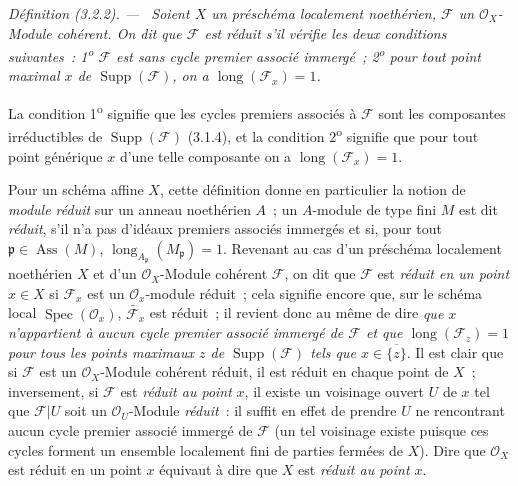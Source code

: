 \documentclass[10pt,oneside]{book}
\newcommand{\oldpage}[2][]{%
  \setcounter{footnote}{0}%
  \marginpar{\scriptsize\textbf{#1}~|~#2}\ignorespaces}
\newenvironment{definition}[1][]{%
  \par\medskip\noindent\itshape Définition (#1). ---\ }{\par}
\begin{document}
\begin{definition}[3.2.2]
\label{IV.2.3.2.2-fr}
Soient $X$ un préschéma localement noethérien, $\mathcal F$ un
$\mathcal O_X$-Module cohérent. On dit que $\mathcal F$ est \emph{réduit}
s'il vérifie les deux conditions suivantes~: 1\textsuperscript{o}
$\mathcal F$ est sans cycle premier associé immergé~; 2\textsuperscript{o}
pour tout point maximal $x$ de $\operatorname{Supp}(\mathcal F)$, on a
$\operatorname{long}(\mathcal F_x)=1$.
\end{definition}

La condition 1\textsuperscript{o} signifie que les cycles premiers associés à
$\mathcal F$ sont les composantes irréductibles de
$\operatorname{Supp}(\mathcal F)$ (3.1.4), et la condition
2\textsuperscript{o} signifie que pour tout point générique $x$ d'une telle
composante on a $\operatorname{long}(\mathcal F_x)=1$.

Pour un schéma affine $X$, cette définition donne en particulier la notion de
\emph{module réduit} sur un anneau noethérien $A$~; un $A$-module de type fini
$M$ est dit \emph{réduit}, s'il n'a pas d'idéaux premiers associés immergés et
si, pour tout $\mathfrak p\in\operatorname{Ass}(M)$,
$\operatorname{long}_{A_\mathfrak p}(M_\mathfrak p)=1$. Revenant au cas d'un
préschéma localement noethérien $X$ et d'un $\mathcal O_X$-Module cohérent
$\mathcal F$, on dit que $\mathcal F$ est \emph{réduit en un point} $x\in X$
si $\mathcal F_x$ est un $\mathcal O_x$-module réduit~; cela signifie encore
que, sur le schéma local $\operatorname{Spec}(\mathcal O_x)$,
$\widetilde{\mathcal F_x}$ est réduit~; il revient donc au même de dire
\emph{que $x$ n'appartient à aucun cycle premier associé immergé de
$\mathcal F$ et que $\operatorname{long}(\mathcal F_z)=1$ pour tous les
points maximaux $z$ de $\operatorname{Supp}(\mathcal F)$ tels que
$x\in\overline{\{z\}}$}. Il est clair que si $\mathcal F$ est un
$\mathcal O_X$-Module cohérent réduit, il est réduit en chaque point de $X$~;
inversement, si $\mathcal F$ est \emph{réduit au point} $x$, il existe un
voisinage ouvert $U$ de $x$ tel que $\mathcal F|U$ soit un
$\mathcal O_U$-Module \emph{réduit}~: il suffit en effet de prendre $U$ ne
rencontrant aucun cycle premier associé immergé de $\mathcal F$ (un tel
voisinage existe puisque ces cycles forment un ensemble localement fini de
parties
\oldpage[IV-2]{41}
fermées de $X$). Dire que $\mathcal O_X$ est réduit en un point $x$ équivaut à
dire que $X$ est \emph{réduit au point $x$}.
\end{document}
